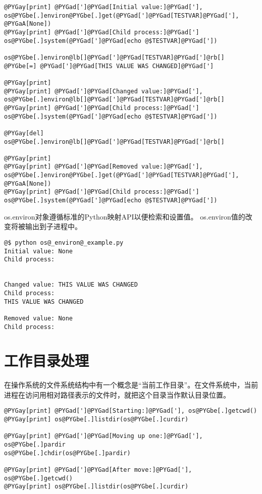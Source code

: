 \documentclass[a4paper,10pt,english]{manual}
\begin{document}
\begin{Verbatim}[commandchars=@\[\]]
@PYGay[print] @PYGad[']@PYGad[Initial value:]@PYGad['], os@PYGbe[.]environ@PYGbe[.]get(@PYGad[']@PYGad[TESTVAR]@PYGad['], @PYGaA[None])
@PYGay[print] @PYGad[']@PYGad[Child process:]@PYGad[']
os@PYGbe[.]system(@PYGad[']@PYGad[echo @$TESTVAR]@PYGad['])

os@PYGbe[.]environ@lb[]@PYGad[']@PYGad[TESTVAR]@PYGad[']@rb[] @PYGbe[=] @PYGad[']@PYGad[THIS VALUE WAS CHANGED]@PYGad[']

@PYGay[print]
@PYGay[print] @PYGad[']@PYGad[Changed value:]@PYGad['], os@PYGbe[.]environ@lb[]@PYGad[']@PYGad[TESTVAR]@PYGad[']@rb[]
@PYGay[print] @PYGad[']@PYGad[Child process:]@PYGad[']
os@PYGbe[.]system(@PYGad[']@PYGad[echo @$TESTVAR]@PYGad['])

@PYGay[del] os@PYGbe[.]environ@lb[]@PYGad[']@PYGad[TESTVAR]@PYGad[']@rb[]

@PYGay[print]
@PYGay[print] @PYGad[']@PYGad[Removed value:]@PYGad['], os@PYGbe[.]environ@PYGbe[.]get(@PYGad[']@PYGad[TESTVAR]@PYGad['], @PYGaA[None])
@PYGay[print] @PYGad[']@PYGad[Child process:]@PYGad[']
os@PYGbe[.]system(@PYGad[']@PYGad[echo @$TESTVAR]@PYGad['])
\end{Verbatim}

os.environ对象遵循标准的Python映射API以便检索和设置值。 os.environ值的改变将被输出到子进程中。

\begin{Verbatim}[commandchars=@\[\]]
@$ python os@_environ@_example.py
Initial value: None
Child process:


Changed value: THIS VALUE WAS CHANGED
Child process:
THIS VALUE WAS CHANGED

Removed value: None
Child process:
\end{Verbatim}


\section{工作目录处理}

在操作系统的文件系统结构中有一个概念是“当前工作目录”。在文件系统中，当前进程在访问用相对路径表示的文件时，就把这个目录当作默认目录位置。

\begin{Verbatim}[commandchars=@\[\]]
@PYGay[print] @PYGad[']@PYGad[Starting:]@PYGad['], os@PYGbe[.]getcwd()
@PYGay[print] os@PYGbe[.]listdir(os@PYGbe[.]curdir)

@PYGay[print] @PYGad[']@PYGad[Moving up one:]@PYGad['], os@PYGbe[.]pardir
os@PYGbe[.]chdir(os@PYGbe[.]pardir)

@PYGay[print] @PYGad[']@PYGad[After move:]@PYGad['], os@PYGbe[.]getcwd()
@PYGay[print] os@PYGbe[.]listdir(os@PYGbe[.]curdir)
\end{Verbatim}
\end{document}
